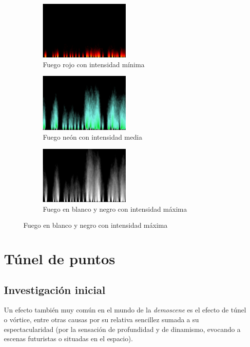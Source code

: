 \begin{figure}[h]
	\centering
	\begin{subfigure}[b]{0.3\textwidth}
		\centering
		\includegraphics[width=4.5cm]{archivos/fire_final1}
		\caption{Fuego rojo con intensidad mínima}
		\label{fig:fire_final1}
	\end{subfigure}
	\begin{subfigure}[b]{0.3\textwidth}
		\centering
		\includegraphics[width=4.5cm]{archivos/fire_final2}
		\caption{Fuego neón con intensidad media}
		\label{fig:fire_final2}
	\end{subfigure}
	\begin{subfigure}[b]{0.3\textwidth}
		\centering
		\includegraphics[width=4.5cm]{archivos/fire_final3}
		\caption{Fuego en blanco y negro con intensidad máxima}
		\label{fig:fire_final3}
	\end{subfigure}
\end{figure}

\section{Túnel de puntos} \label{sec:dottunnel}

\subsection{Investigación inicial}

Un efecto también muy común en el mundo de la \emph{demoscene} es el efecto de túnel o vórtice, entre otras causas por su relativa sencillez sumada a su espectacularidad (por la sensación de profundidad y de dinamismo, evocando a escenas futuristas o situadas en el espacio).\\


